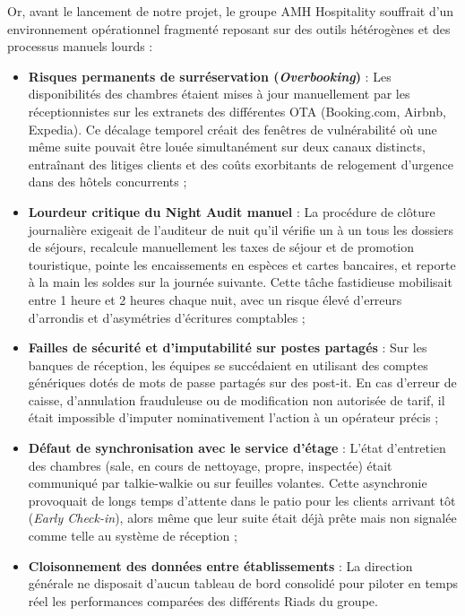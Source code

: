 \documentclass[12pt,a4paper,oneside]{report}
\begin{document}
Or, avant le lancement de notre projet, le groupe AMH Hospitality souffrait d'un environnement opérationnel fragmenté reposant sur des outils hétérogènes et des processus manuels lourds :

\begin{itemize}
    \item \textbf{Risques permanents de surréservation (\textit{Overbooking})} : Les disponibilités des chambres étaient mises à jour manuellement par les réceptionnistes sur les extranets des différentes OTA (Booking.com, Airbnb, Expedia). Ce décalage temporel créait des fenêtres de vulnérabilité où une même suite pouvait être louée simultanément sur deux canaux distincts, entraînant des litiges clients et des coûts exorbitants de relogement d'urgence dans des hôtels concurrents ;
    \item \textbf{Lourdeur critique du Night Audit manuel} : La procédure de clôture journalière exigeait de l'auditeur de nuit qu'il vérifie un à un tous les dossiers de séjours, recalcule manuellement les taxes de séjour et de promotion touristique, pointe les encaissements en espèces et cartes bancaires, et reporte à la main les soldes sur la journée suivante. Cette tâche fastidieuse mobilisait entre 1 heure et 2 heures chaque nuit, avec un risque élevé d'erreurs d'arrondis et d'asymétries d'écritures comptables ;
    \item \textbf{Failles de sécurité et d'imputabilité sur postes partagés} : Sur les banques de réception, les équipes se succédaient en utilisant des comptes génériques dotés de mots de passe partagés sur des post-it. En cas d'erreur de caisse, d'annulation frauduleuse ou de modification non autorisée de tarif, il était impossible d'imputer nominativement l'action à un opérateur précis ;
    \item \textbf{Défaut de synchronisation avec le service d'étage} : L'état d'entretien des chambres (sale, en cours de nettoyage, propre, inspectée) était communiqué par talkie-walkie ou sur feuilles volantes. Cette asynchronie provoquait de longs temps d'attente dans le patio pour les clients arrivant tôt (\textit{Early Check-in}), alors même que leur suite était déjà prête mais non signalée comme telle au système de réception ;
    \item \textbf{Cloisonnement des données entre établissements} : La direction générale ne disposait d'aucun tableau de bord consolidé pour piloter en temps réel les performances comparées des différents Riads du groupe.
\end{itemize}
\end{document}
